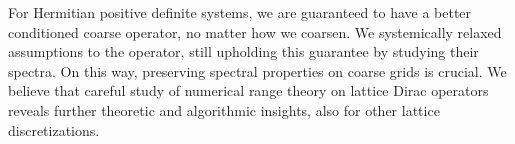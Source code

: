 For Hermitian positive definite systems, we are guaranteed to have a better conditioned coarse operator, no matter how we coarsen.
We systemically relaxed assumptions to the operator, still upholding this guarantee by studying their spectra. 
On this way, preserving spectral properties on coarse grids is crucial.
We believe that careful study of numerical range theory on lattice Dirac operators reveals further theoretic and algorithmic insights, also for other lattice discretizations.

